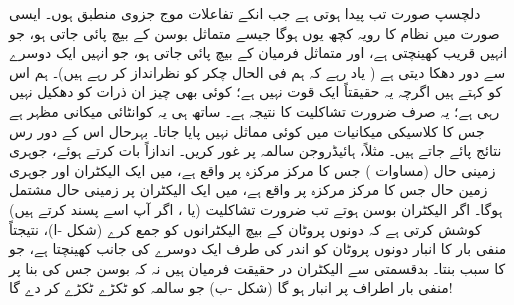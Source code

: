 دلچسپ صورت تب پیدا ہوتی ہے جب انکے تفاعلات موج جزوی منطبق ہوں۔ ایسی صورت میں نظام کا رویہ کچھ یوں ہوگا جیسے متماثل بوسن کے بیچ پائی جاتی ہو، جو انہیں قریب کھینچتی ہے، اور متماثل فرمیان کے بیچ  پائی جاتی ہو، جو انہیں ایک دوسرے سے دور دھکا دیتی ہے ( یاد رہے کہ ہم فی الحال چکر کو نظرانداز کر رہے ہیں)۔ ہم اس کو  کہتے ہیں اگرچہ یہ حقیقتاً ایک قوت نہیں ہے؛ کوئی بھی چیز ان ذرات کو دھکیل نہیں رہی ہے؛ یہ صرف ضرورت تشاکلیت کا  نتیجہ ہے۔ ساتھ ہی یہ کوانٹائی میکانی مظہر ہے جس کا کلاسیکی میکانیات میں کوئی مماثل نہیں پایا جاتا۔ بہرحال اس کے دور رس نتائج پائے جاتے ہیں۔ مثلاً، ہائیڈروجن سالمہ  پر غور کریں۔ اندازاً بات کرتے ہوئے، جوہری زمینی حال (مساوات ) جس کا مرکز مرکزہ  پر واقع ہے، میں ایک الیکٹران اور جوہری زمین حال جس کا مرکز مرکزہ  پر واقع ہے، میں ایک الیکٹران پر زمینی حال مشتمل ہوگا۔ اگر الیکٹران بوسن ہوتے تب ضرورت تشاکلیت (یا ، اگر آپ اسے پسند کرتے ہیں) کوشش کرتی ہے کہ دونوں پروٹان کے بیچ الیکٹرانوں کو جمع کرے
 (شکل -ا)، نتیجتاً منفی بار کا انبار دونوں پروٹان کو اندر کی طرف ایک دوسرے کی جانب کھینچتا ہے، جو  کا سبب بنتا۔ بدقسمتی سے الیکٹران در حقیقت فرمیان ہیں نہ کہ بوسن جس کی بنا پر منفی بار اطراف پر انبار ہو گا (شکل -ب) جو سالمہ کو ٹکڑے ٹکڑے کر دے گا!

